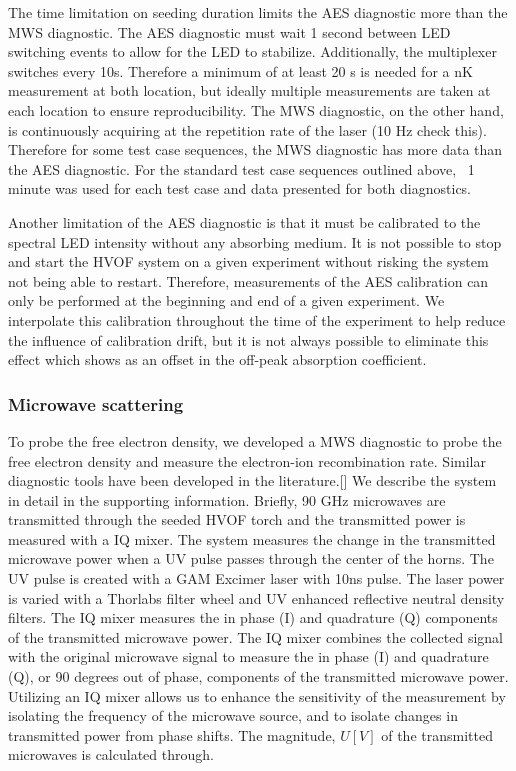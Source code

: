 The time limitation on seeding duration limits the AES diagnostic more than the MWS diagnostic. The AES diagnostic must wait 1 second between LED switching events to allow for the LED to stabilize. Additionally, the multiplexer switches every 10s. Therefore a minimum of at least 20 s is needed for a nK measurement at both location, but ideally multiple measurements are taken at each location to ensure reproducibility. The MWS diagnostic, on the other hand, is continuously acquiring at the repetition rate of the laser (10 Hz check this). Therefore for some test case sequences, the MWS diagnostic has more data than the AES diagnostic. For the standard test case sequences outlined above, ~1 minute was used for each test case and data presented for both diagnostics.  

Another limitation of the AES diagnostic is that it must be calibrated to the spectral LED intensity without any absorbing medium. It is not possible to stop and start the HVOF system on a given experiment without risking the system not being able to restart. Therefore, measurements of the AES calibration can only be performed at the beginning and end of a given experiment. We interpolate this calibration throughout the time of the experiment to help reduce the influence of calibration drift, but it is not always possible to eliminate this effect which shows as an offset in the off-peak absorption coefficient.

\subsubsection{Microwave scattering}

To probe the free electron density, we developed a MWS diagnostic to probe the free electron density and measure the electron-ion recombination rate. Similar diagnostic tools have been developed in the literature.[]  We describe the system in detail in the supporting information. Briefly, 90 GHz microwaves are transmitted through the seeded HVOF torch and the transmitted power is measured with a IQ mixer. The system measures the change in the transmitted microwave power when a UV pulse passes through the center of the horns. The UV pulse is created with a GAM Excimer laser with 10ns pulse. The laser power is varied with a Thorlabs filter wheel and UV enhanced reflective neutral density filters. The IQ mixer measures the in phase (I) and quadrature (Q) components of the transmitted microwave power. The IQ mixer combines the collected signal with the original microwave signal to measure the in phase (I) and quadrature (Q), or 90 degrees out of phase, components of the transmitted microwave power. Utilizing an IQ mixer allows us to enhance the sensitivity of the measurement by isolating the frequency of the microwave source, and to isolate changes in transmitted power from phase shifts. The magnitude, $U [V]$ of the transmitted microwaves is calculated through.

